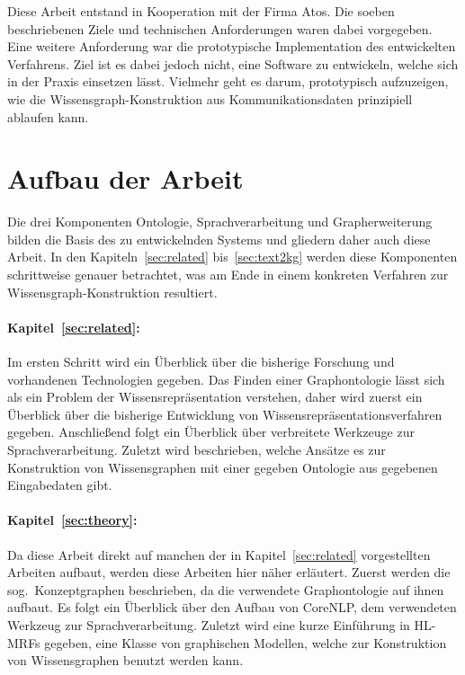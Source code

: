 Diese Arbeit entstand in Kooperation mit der Firma Atos.
Die soeben beschriebenen Ziele und technischen Anforderungen waren dabei vorgegeben.
Eine weitere Anforderung war die prototypische Implementation des entwickelten Verfahrens.
Ziel ist es dabei jedoch nicht, eine Software zu entwickeln, welche sich in der Praxis einsetzen lässt.
Vielmehr geht es darum, prototypisch aufzuzeigen, wie die Wissensgraph-Konstruktion aus Kommunikationsdaten prinzipiell ablaufen kann.

\section{Aufbau der Arbeit}%
\label{sec:intro:structure}

Die drei Komponenten Ontologie, Sprachverarbeitung und Grapherweiterung bilden die Basis des zu entwickelnden Systems und gliedern daher auch diese Arbeit.
In den Kapiteln~\ref{sec:related} bis~\ref{sec:text2kg} werden diese Komponenten schrittweise genauer betrachtet, was am Ende in einem konkreten Verfahren zur Wissensgraph-Konstruktion resultiert.

\paragraph{Kapitel~\ref{sec:related}: }
Im ersten Schritt wird ein Überblick über die bisherige Forschung und vorhandenen Technologien gegeben.
Das Finden einer Graphontologie lässt sich als ein Problem der Wissensrepräsentation verstehen, daher wird zuerst ein Überblick über die bisherige Entwicklung von Wissensrepräsentationsverfahren gegeben.
Anschließend folgt ein Überblick über verbreitete Werkzeuge zur Sprachverarbeitung.
Zuletzt wird beschrieben, welche Ansätze es zur Konstruktion von Wissensgraphen mit einer gegeben Ontologie aus gegebenen Eingabedaten gibt.

\paragraph{Kapitel~\ref{sec:theory}: }
Da diese Arbeit direkt auf manchen der in Kapitel~\ref{sec:related} vorgestellten Arbeiten aufbaut, werden diese Arbeiten hier näher erläutert.
Zuerst werden die sog.\ Konzeptgraphen beschrieben, da die verwendete Graphontologie auf ihnen aufbaut.
Es folgt ein Überblick über den Aufbau von CoreNLP, dem verwendeten Werkzeug zur Sprachverarbeitung.
Zuletzt wird eine kurze Einführung in HL-MRFs gegeben, eine Klasse von graphischen Modellen, welche zur Konstruktion von Wissensgraphen benutzt werden kann.

